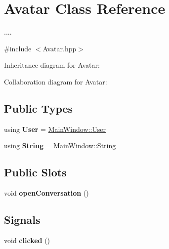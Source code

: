 \hypertarget{classAvatar}{}\section{Avatar Class Reference}
\label{classAvatar}


....  




{\ttfamily \#include $<$Avatar.\+hpp$>$}



Inheritance diagram for Avatar\+:


Collaboration diagram for Avatar\+:
\subsection*{Public Types}
\begin{DoxyCompactItemize}
\item 
using {\bfseries User} = \hyperlink{classClientUser}{Main\+Window\+::\+User}\hypertarget{classAvatar_a352e86b0217fe9efbfb2fd043d56f74e}{}\label{classAvatar_a352e86b0217fe9efbfb2fd043d56f74e}

\item 
using {\bfseries String} = Main\+Window\+::\+String\hypertarget{classAvatar_a01a9c436ea7bb1e9505aecc22fc10aa0}{}\label{classAvatar_a01a9c436ea7bb1e9505aecc22fc10aa0}

\end{DoxyCompactItemize}
\subsection*{Public Slots}
\begin{DoxyCompactItemize}
\item 
void {\bfseries open\+Conversation} ()\hypertarget{classAvatar_a94dab579111aa83edf4896f0b215be3e}{}\label{classAvatar_a94dab579111aa83edf4896f0b215be3e}

\end{DoxyCompactItemize}
\subsection*{Signals}
\begin{DoxyCompactItemize}
\item 
void {\bfseries clicked} ()\hypertarget{classAvatar_a02690dd056d258245af16d6642cb212b}{}\label{classAvatar_a02690dd056d258245af16d6642cb212b}

\end{DoxyCompactItemize}
